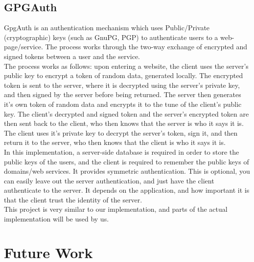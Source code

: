 \documentclass[11pt]{article}
\begin{document}
\subsection{GPGAuth} \label{subsec:gpgauth}
GpgAuth\cite{gpgauth} is an authentication mechanism which uses Public/Private (cryptographic) keys (such as GnuPG, PGP) to authenticate users to a web-page/service.  The process works through the two-way exchange of encrypted and signed tokens between a user and the service.\\
	The process works as follows: upon entering a website, the client uses the server's public key to encrypt a token of random data, generated locally.  The encrypted token is sent to the server, where it is decrypted using the server's private key, and then signed by the server before being returned.  The server then generates it's own token of random data and encrypts it to the tune of the client's public key.  The client's decrypted and signed token  and the server's encrypted token are then sent back to the client, who then knows that the server is who it says it is.  The client uses it's private key to decrypt the server's token, sign it, and then return it to the server, who then knows that the client is who it says it is.\\
	In this implementation, a server-side database is required in order to store the public keys of the users, and the client is required to remember the public keys of domains/web services. It provides symmetric authentication. This is optional, you can easily leave out the server authentication, and just have the client authenticate to the server. It depends on the application, and how important it is that the client trust the identity of the server.\\
	This project is very similar to our implementation, and parts of the actual implementation will be used by us.


\section{Future Work} \label{sec:futureWork}

\pagebreak

{}
\end{document}

